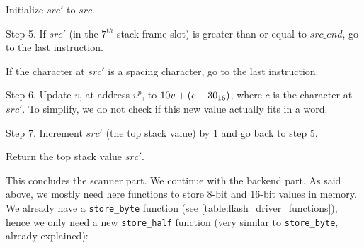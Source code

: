\begin{Paragraph}
\begin{paracol}{2}

Initialize $src'$ to $src$.


Step 5. If $src'$ (in the $7^{th}$ stack frame slot) is greater than or equal to
$src\_end$, go to the last instruction.


If the character at $src'$ is a spacing character, go to the last instruction.


Step 6. Update $v$, at address $v^p$, to $10v+(c-30_{16})$, where $c$ is the
character at $src'$. To simplify, we do not check if this new value actually
fits in a word.


Step 7. Increment $src'$ (the top stack value) by 1 and go back to step 5.


Return the top stack value $src'$.

\end{paracol}
\end{Paragraph}

This concludes the scanner part. We continue with the backend part. As said
above, we mostly need here functions to store 8-bit and 16-bit values in memory.
We already have a \verb!store_byte! function (see
\cref{table:flash_driver_functions}), hence we only need a new \verb!store_half!
function (very similar to \verb!store_byte!, already explained):

\begin{TwoColumns}
\\
\end{TwoColumns}

